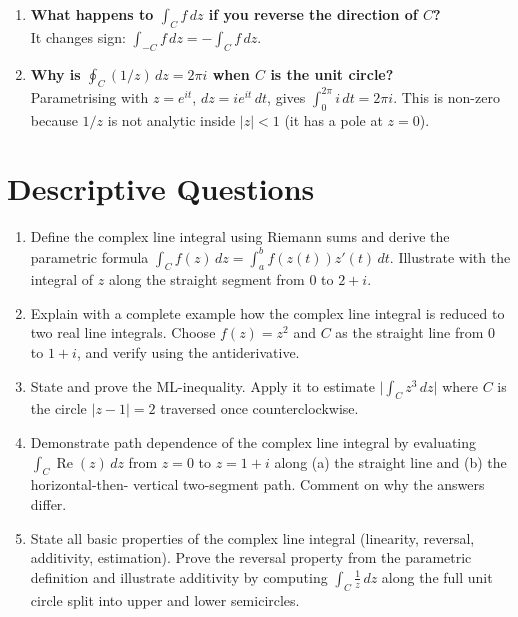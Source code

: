 \documentclass[12pt,a4paper]{article}
\begin{document}
\begin{enumerate}[label=\textbf{V\arabic*.}, leftmargin=*]
  \item \textbf{What happens to $\int_C f\,dz$ if you reverse the
        direction of $C$?} \\
        It changes sign: $\int_{-C} f\,dz = -\int_C f\,dz$.

  \item \textbf{Why is $\oint_C (1/z)\,dz = 2\pi i$ when $C$ is the
        unit circle?} \\
        Parametrising with $z = e^{it}$, $dz = ie^{it}\,dt$, gives
        $\int_0^{2\pi} i\,dt = 2\pi i$. This is non-zero because $1/z$
        is not analytic inside $|z|<1$ (it has a pole at $z=0$).
\end{enumerate}

\section{Descriptive Questions}
\begin{enumerate}[label=\textbf{D\arabic*.}, leftmargin=*]
  \item Define the complex line integral using Riemann sums and derive the
        parametric formula $\int_C f(z)\,dz = \int_a^b f(z(t))z'(t)\,dt$.
        Illustrate with the integral of $z$ along the straight segment
        from $0$ to $2+i$.

  \item Explain with a complete example how the complex line integral is
        reduced to two real line integrals. Choose $f(z) = z^2$ and
        $C$ as the straight line from $0$ to $1+i$, and verify using the
        antiderivative.

  \item State and prove the ML-inequality. Apply it to estimate
        $\bigl|\int_C z^3\,dz\bigr|$ where $C$ is the circle $|z-1|=2$
        traversed once counterclockwise.

  \item Demonstrate path dependence of the complex line integral by
        evaluating $\int_C \operatorname{Re}(z)\,dz$ from $z=0$ to
        $z=1+i$ along (a) the straight line and (b) the horizontal-then-
        vertical two-segment path. Comment on why the answers differ.

  \item State all basic properties of the complex line integral
        (linearity, reversal, additivity, estimation). Prove the reversal
        property from the parametric definition and illustrate additivity
        by computing $\int_C \frac{1}{z}\,dz$ along the full unit circle
        split into upper and lower semicircles.
\end{enumerate}
\end{document}
